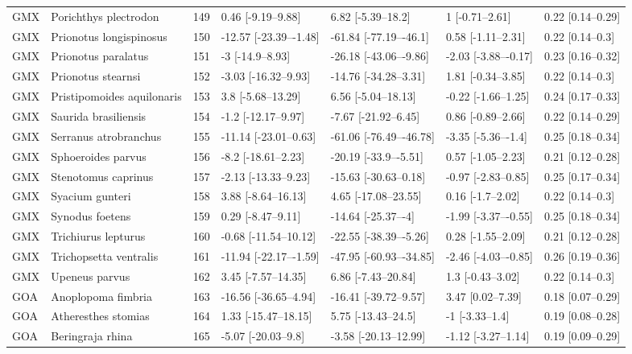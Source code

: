 \begin{longtable}[t]{lllllll}
GMX & Porichthys plectrodon & 149 & 0.46 [-9.19–9.88] & 6.82 [-5.39–18.2] & 1 [-0.71–2.61] & 0.22 [0.14–0.29]\\
GMX & Prionotus longispinosus & 150 & -12.57 [-23.39–-1.48] & -61.84 [-77.19–-46.1] & 0.58 [-1.11–2.31] & 0.22 [0.14–0.3]\\
\addlinespace
GMX & Prionotus paralatus & 151 & -3 [-14.9–8.93] & -26.18 [-43.06–-9.86] & -2.03 [-3.88–-0.17] & 0.23 [0.16–0.32]\\
GMX & Prionotus stearnsi & 152 & -3.03 [-16.32–9.93] & -14.76 [-34.28–3.31] & 1.81 [-0.34–3.85] & 0.22 [0.14–0.3]\\
GMX & Pristipomoides aquilonaris & 153 & 3.8 [-5.68–13.29] & 6.56 [-5.04–18.13] & -0.22 [-1.66–1.25] & 0.24 [0.17–0.33]\\
GMX & Saurida brasiliensis & 154 & -1.2 [-12.17–9.97] & -7.67 [-21.92–6.45] & 0.86 [-0.89–2.66] & 0.22 [0.14–0.29]\\
GMX & Serranus atrobranchus & 155 & -11.14 [-23.01–0.63] & -61.06 [-76.49–-46.78] & -3.35 [-5.36–-1.4] & 0.25 [0.18–0.34]\\
\addlinespace
GMX & Sphoeroides parvus & 156 & -8.2 [-18.61–2.23] & -20.19 [-33.9–-5.51] & 0.57 [-1.05–2.23] & 0.21 [0.12–0.28]\\
GMX & Stenotomus caprinus & 157 & -2.13 [-13.33–9.23] & -15.63 [-30.63–0.18] & -0.97 [-2.83–0.85] & 0.25 [0.17–0.34]\\
GMX & Syacium gunteri & 158 & 3.88 [-8.64–16.13] & 4.65 [-17.08–23.55] & 0.16 [-1.7–2.02] & 0.22 [0.14–0.3]\\
GMX & Synodus foetens & 159 & 0.29 [-8.47–9.11] & -14.64 [-25.37–-4] & -1.99 [-3.37–-0.55] & 0.25 [0.18–0.34]\\
GMX & Trichiurus lepturus & 160 & -0.68 [-11.54–10.12] & -22.55 [-38.39–-5.26] & 0.28 [-1.55–2.09] & 0.21 [0.12–0.28]\\
\addlinespace
GMX & Trichopsetta ventralis & 161 & -11.94 [-22.17–-1.59] & -47.95 [-60.93–-34.85] & -2.46 [-4.03–-0.85] & 0.26 [0.19–0.36]\\
GMX & Upeneus parvus & 162 & 3.45 [-7.57–14.35] & 6.86 [-7.43–20.84] & 1.3 [-0.43–3.02] & 0.22 [0.14–0.3]\\
GOA & Anoplopoma fimbria & 163 & -16.56 [-36.65–4.94] & -16.41 [-39.72–9.57] & 3.47 [0.02–7.39] & 0.18 [0.07–0.29]\\
GOA & Atheresthes stomias & 164 & 1.33 [-15.47–18.15] & 5.75 [-13.43–24.5] & -1 [-3.33–1.4] & 0.19 [0.08–0.28]\\
GOA & Beringraja rhina & 165 & -5.07 [-20.03–9.8] & -3.58 [-20.13–12.99] & -1.12 [-3.27–1.14] & 0.19 [0.09–0.29]\\

\end{longtable}
